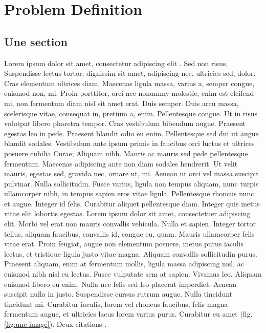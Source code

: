 \chapter{Problem Definition}
\label{chap:problem-definition}

\section{Une section}
Lorem ipsum dolor sit amet, consectetur adipiscing elit \cite{Roque2012,Roque2012b,Roque2012c,Roque2012d}. Sed non risus. Suspendisse lectus tortor, dignissim sit amet, adipiscing nec, ultricies sed, dolor. Cras elementum ultrices diam. Maecenas ligula massa, varius a, semper congue, euismod non, mi. Proin porttitor, orci nec nonummy molestie, enim est eleifend mi, non fermentum diam nisl sit amet erat. Duis semper. Duis arcu massa, scelerisque vitae, consequat in, pretium a, enim. Pellentesque congue. Ut in risus volutpat libero pharetra tempor. Cras vestibulum bibendum augue. Praesent egestas leo in pede. Praesent blandit odio eu enim. Pellentesque sed dui ut augue blandit sodales. Vestibulum ante ipsum primis in faucibus orci luctus et ultrices posuere cubilia Curae; Aliquam nibh. Mauris ac mauris sed pede pellentesque fermentum. Maecenas adipiscing ante non diam sodales hendrerit. Ut velit mauris, egestas sed, gravida nec, ornare ut, mi. Aenean ut orci vel massa suscipit pulvinar. Nulla sollicitudin. Fusce varius, ligula non tempus aliquam, nunc turpis ullamcorper nibh, in tempus sapien eros vitae ligula. Pellentesque rhoncus nunc et augue. Integer id felis. Curabitur aliquet pellentesque diam. Integer quis metus vitae elit lobortis egestas. Lorem ipsum dolor sit amet, consectetuer adipiscing elit. Morbi vel erat non mauris convallis vehicula. Nulla et sapien. Integer tortor tellus, aliquam faucibus, convallis id, congue eu, quam. Mauris ullamcorper felis vitae erat. Proin feugiat, augue non elementum posuere, metus purus iaculis lectus, et tristique ligula justo vitae magna. Aliquam convallis sollicitudin purus. Praesent aliquam, enim at fermentum mollis, ligula massa adipiscing nisl, ac euismod nibh nisl eu lectus. Fusce vulputate sem at sapien. Vivamus leo. Aliquam euismod libero eu enim. Nulla nec felis sed leo placerat imperdiet. Aenean suscipit nulla in justo. Suspendisse cursus rutrum augue. Nulla tincidunt tincidunt mi. Curabitur iaculis, lorem vel rhoncus faucibus, felis magna fermentum augue, et ultricies lacus lorem varius purus. Curabitur eu amet (fig. \ref{fig:une-image}). Deux citations \cite{Arapoglou2011,Roque2013c}.

